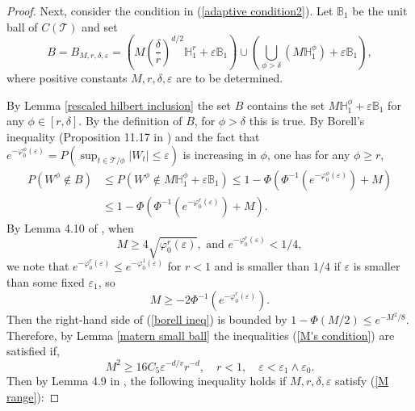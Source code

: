 \documentclass[ejs,noshowframe]{imsart}
\theoremstyle{plain}
\theoremstyle{definition}
\theoremstyle{remark}
\begin{document}
\begin{appendix}
\begin{proof}
Next, consider the condition in (\ref{adaptive condition2}). Let
$\mathbb{B}_1$ be the unit ball of $C(\mathcal{T})$ and set
\begin{equation}
B=B_{M, r, \delta, \varepsilon}=\left(M ({\frac{\delta}{r}})^{d/2} \mathbb{H}_1^r+\varepsilon \mathbb{B}_1\right) \cup\left(\bigcup_{{\phi} > \delta}\left(M \mathbb{H}_1^{\phi}\right)+\varepsilon \mathbb{B}_1\right),
\end{equation}
 where positive constants $M, r, \delta, \varepsilon$ are to be determined.

By Lemma \ref{rescaled hilbert inclusion} the set $B$ contains the set $M \mathbb{H}_1^{\phi}+\varepsilon \mathbb{B}_1$ for any ${\phi} \in[r, \delta]$. By the definition of $B$,  for ${\phi}>\delta$  this is true. By Borell's inequality (Proposition 11.17 in \cite{ghosal2017fundamentals}) and the fact that $e^{-\varphi_0^{\phi}(\varepsilon)}=P\left(\sup _{t \in \mathcal{T}/\phi}\left|W_t\right| \leq \varepsilon\right)$ is increasing in ${\phi}$,  one has for any ${\phi} \geq r$,
\begin{equation}\label{borell ineq}
\begin{aligned}
P\left(W^{\phi} \notin B\right) & \leq P\left(W^{\phi} \notin M \mathbb{H}_1^{\phi}+\varepsilon \mathbb{B}_1\right) \leq 1-\Phi\left(\Phi^{-1}\left(e^{-\varphi_0^{\phi}(\varepsilon)}\right)+M\right) \\
& \leq 1-\Phi\left(\Phi^{-1}\left(e^{-\varphi_0^r(\varepsilon)}\right)+M\right).
\end{aligned}
\end{equation}
By Lemma 4.10 of \cite{van2009adaptive}, when 
\begin{equation} \label{M's condition}
M \geq 4 \sqrt{\varphi_0^r(\varepsilon)}, \text { and } e^{-\varphi_0^r(\varepsilon)}<1 / 4 ,
\end{equation}
we note that $e^{-\varphi_0^r(\varepsilon)} \leq e^{-\varphi_0^1(\varepsilon)}$ for $r<1$ and is  smaller than $1 / 4$ if $\varepsilon$ is smaller than some fixed $\varepsilon_1$, so  
$$
M \geq-2 \Phi^{-1}\left(e^{-\varphi_0^r(\varepsilon)}\right).
$$
Then the right-hand side of (\ref{borell ineq}) is bounded by $1-\Phi(M / 2) \leq e^{-M^2 / 8}$. Therefore, by Lemma \ref{matern small ball} the inequalities (\ref{M's condition})  are satisfied if,
\begin{equation}\label{M range}
M^2 \geq 16 C_5 \varepsilon^{-d/v} r^{-d}, \quad r<1, \quad \varepsilon<\varepsilon_1 \wedge \varepsilon_0 .
\end{equation}
Then by Lemma 4.9 in \cite{van2009adaptive}, the following inequality holds if  $M, r, \delta, \varepsilon$ satisfy  (\ref{M range}):

\end{proof}
\end{appendix}
\end{document}

